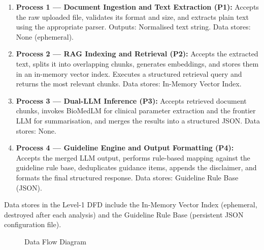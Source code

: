 \documentclass[12pt,a4paper]{report}
\begin{document}
\begin{enumerate}
    \item \textbf{Process 1 --- Document Ingestion and Text Extraction (P1):} Accepts the raw uploaded file, validates its format and size, and extracts plain text using the appropriate parser. Outputs: Normalised text string. Data stores: None (ephemeral).
    \item \textbf{Process 2 --- RAG Indexing and Retrieval (P2):} Accepts the extracted text, splits it into overlapping chunks, generates embeddings, and stores them in an in-memory vector index. Executes a structured retrieval query and returns the most relevant chunks. Data stores: In-Memory Vector Index.
    \item \textbf{Process 3 --- Dual-LLM Inference (P3):} Accepts retrieved document chunks, invokes BioMedLM for clinical parameter extraction and the frontier LLM for summarisation, and merges the results into a structured JSON. Data stores: None.
    \item \textbf{Process 4 --- Guideline Engine and Output Formatting (P4):} Accepts the merged LLM output, performs rule-based mapping against the guideline rule base, deduplicates guidance items, appends the disclaimer, and formats the final structured response. Data stores: Guideline Rule Base (JSON).
\end{enumerate}

Data stores in the Level-1 DFD include the In-Memory Vector Index (ephemeral, destroyed after each analysis) and the Guideline Rule Base (persistent JSON configuration file).

\begin{figure}[h]
    \centering
    \caption{Data Flow Diagram}
\end{figure}
\end{document}
